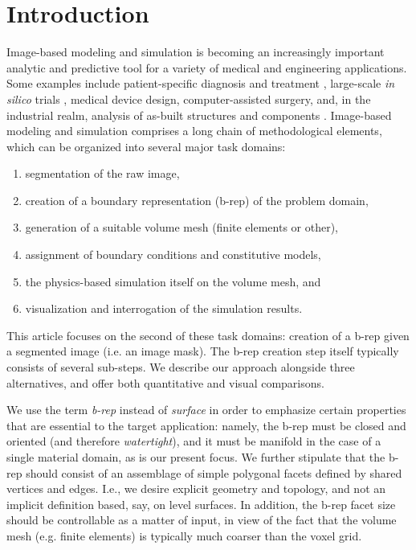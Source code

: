 \section{Introduction}

Image-based modeling and simulation is becoming an increasingly important analytic and predictive tool for a variety of medical and engineering applications. Some examples include patient-specific diagnosis and treatment \cite{neal2010current}, large-scale \textit{in silico} trials \cite{viceconti2016silico}, medical device design, computer-assisted surgery, and, in the industrial realm, analysis of as-built structures and components \cite{bradley2005advances}. Image-based modeling and simulation comprises a long chain of methodological elements, which can be organized into several major task domains:
\begin{enumerate}
\item
segmentation of the raw image, 
\item
creation of a boundary representation (b-rep) of the problem domain,
\item
generation of a suitable volume mesh (finite elements or other), 
\item
assignment
of boundary conditions and constitutive models, 
\item
the physics-based
simulation itself on the volume mesh, and
\item
visualization and interrogation of the simulation results.
\end{enumerate}
This article focuses on the second of these task domains:  creation of a b-rep given a segmented image (i.e. an image mask).  
The b-rep creation step itself typically consists of several sub-steps.  
We describe our approach alongside three alternatives, and offer both quantitative and visual comparisons.

We use the term {\em b-rep} instead of {\em surface}
in order to emphasize certain properties that are essential to the target
application:  namely, the b-rep must be closed and oriented (and therefore 
\textit{watertight}), and it must be manifold in the case of a single material domain, as is our present focus.  We further stipulate that the b-rep should consist of an assemblage of simple polygonal facets defined by shared vertices and 
edges.  I.e., we desire explicit geometry and topology, and not an implicit definition based, say, on level surfaces. In addition, the b-rep facet size should be controllable as a matter of input, in view of the fact that the volume mesh (e.g. finite elements) is typically much coarser than the voxel grid.

